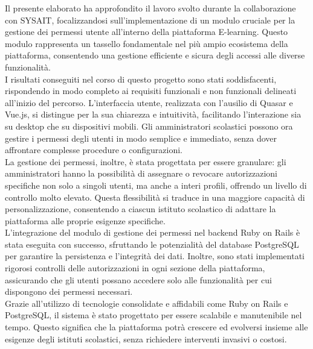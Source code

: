 \documentclass[a4paper, 12pt]{book}
\begin{document}
\thispagestyle{empty}


Il presente elaborato ha approfondito il lavoro svolto durante la collaborazione con SYSAIT, focalizzandosi
sull'implementazione di un modulo cruciale per la gestione dei permessi utente all'interno della
piattaforma E-learning. Questo modulo rappresenta un tassello fondamentale nel più ampio ecosistema
della piattaforma, consentendo una gestione efficiente e sicura degli accessi alle diverse funzionalità.\\

I risultati conseguiti nel corso di questo progetto sono stati soddisfacenti, rispondendo in modo
completo ai requisiti funzionali e non funzionali delineati all'inizio del percorso.
L'interfaccia utente, realizzata con l'ausilio di Quasar e Vue.js, si distingue per la sua chiarezza e intuitività,
facilitando l'interazione sia su desktop che su dispositivi mobili. Gli amministratori scolastici possono ora gestire
i permessi degli utenti in modo semplice e immediato, senza dover affrontare complesse procedure o configurazioni.\\

La gestione dei permessi, inoltre, è stata progettata per essere granulare: gli amministratori hanno la
possibilità di assegnare o revocare autorizzazioni specifiche non solo a singoli utenti, ma anche a interi profili,
offrendo un livello di controllo molto elevato. Questa flessibilità si traduce in una maggiore capacità di
personalizzazione, consentendo a ciascun istituto scolastico di adattare la piattaforma alle proprie esigenze specifiche.\\

L'integrazione del modulo di gestione dei permessi nel backend Ruby on Rails è stata eseguita con successo,
sfruttando le potenzialità del database PostgreSQL per garantire la persistenza e l'integrità dei dati.
Inoltre, sono stati implementati rigorosi controlli delle autorizzazioni in ogni sezione della piattaforma,
assicurando che gli utenti possano accedere solo alle funzionalità per cui dispongono dei permessi necessari.\\

Grazie all'utilizzo di tecnologie consolidate e affidabili come Ruby on Rails e PostgreSQL, il sistema
è stato progettato per essere scalabile e manutenibile nel tempo. Questo significa che la piattaforma potrà crescere
ed evolversi insieme alle esigenze degli istituti scolastici, senza richiedere interventi invasivi o costosi.\\
\end{document}
